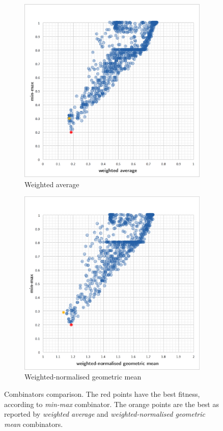 \begin{figure}
	\centering
	\begin{subfigure}{0.6\textwidth}
		\centering
		\includegraphics[width=1\linewidth]{figures/combinator_max_sum}
		\caption{Weighted average}
	\end{subfigure}
	\begin{subfigure}{0.6\textwidth}
		\centering
		\includegraphics[width=1\linewidth]{figures/combinator_max_prod}
		\caption{Weighted-normalised geometric mean}
	\end{subfigure}
	\caption{Combinators comparison. The red points have the best fitness, according to \textit{min-max} combinator. The orange points are the best as reported by \textit{weighted average} and \textit{weighted-normalised geometric mean} combinators.}
	\label{fig:combinators}
\end{figure}

